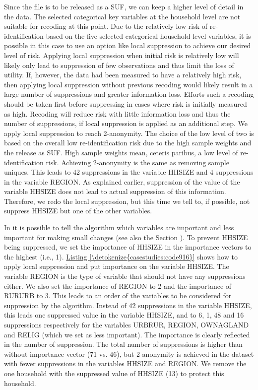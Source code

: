 \documentclass[letterpaper,10pt,english]{sphinxmanual}
\begin{document}
Since the file is to be released as a SUF, we can keep a higher level of
detail in the data. The selected categorical key variables at the
household level are not suitable for recoding at this point. Due to the
relatively low risk of re-identification based on the five selected
categorical household level variables, it is possible in this case to
use an option like local suppression to achieve our desired level of
risk. Applying local suppression when initial risk is relatively low
will likely only lead to suppression of few observations and thus limit
the loss of utility. If, however, the data had been measured to have a
relatively high risk, then applying local suppression without previous
recoding would likely result in a large number of suppressions and
greater information loss. Efforts such a recoding should be taken first
before suppressing in cases where risk is initially measured as high.
Recoding will reduce risk with little information loss and thus the
number of suppressions, if local suppression is applied as an additional
step. We apply local suppression to reach 2-anonymity. The choice of the
low level of two is based on the overall low re-identification risk due
to the high sample weights and the release as SUF. High sample weights
mean, ceteris paribus, a low level of re-identification risk. Achieving
2-anonymity is the same as removing sample uniques. This leads to 42
suppressions in the variable HHSIZE and 4 suppressions in the variable
REGION. As explained earlier, suppression of the value of the variable
HHSIZE does not lead to actual suppression of this information.
Therefore, we redo the local suppression, but this time we tell
 to, if possible, not suppress HHSIZE but one of the other
variables.

In  it is possible to tell the algorithm which variables are
important and less important for making small changes (see also the Section
).
To prevent HHSIZE being suppressed, we set the importance of
HHSIZE in the importance vectors to the highest (i.e., 1). \hyperref[\detokenize{casestudies:code916}]{Listing \ref{\detokenize{casestudies:code916}}}
shows how to apply local suppression and put importance on the variable
HHSIZE. The variable REGION is the type of variable that should not have
any suppressions either. We also set the importance of REGION to 2 and
the importance of RURURB to 3. This leads to an order of the variables
to be considered for suppression by the algorithm. Instead of 42
suppressions in the variable HHSIZE, this leads one suppressed value in
the variable HHSIZE, and to 6, 1, 48 and 16 suppressions respectively
for the variables URBRUR, REGION, OWNAGLAND and RELIG (which we set as
less important). The importance is clearly reflected in the number of
suppression. The total number of suppressions is higher than without
importance vector (71 vs. 46), but 2-anonymity is achieved in the
dataset with fewer suppressions in the variables HHSIZE and REGION. We
remove the one household with the suppressed value of HHSIZE (13) to
protect this household.
\end{document}
